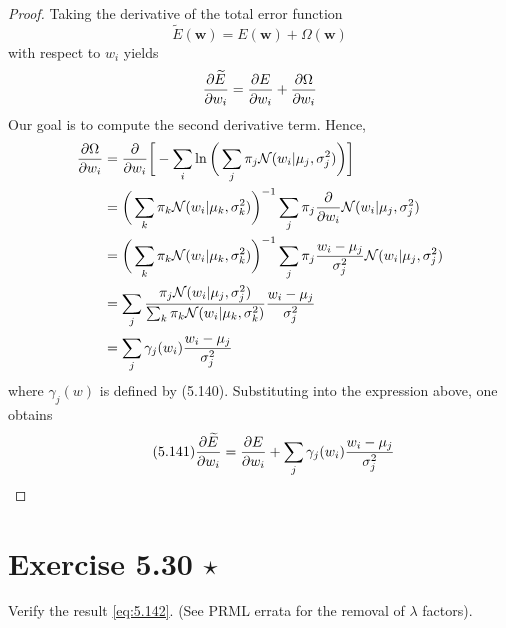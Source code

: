 \begin{proof}

    Taking the derivative of the total error function 
    \begin{equation}\label{eq:5.139}\tag{5.139}
        \widetilde{E}(\mathbf{w}) = E(\mathbf{w}) + \Omega(\mathbf{w})
    \end{equation}
    with respect to $w_i$ yields
    \begin{align*}
        \pdv{\widetilde{E}}{w_i} = \pdv{E}{w_i} + \pdv{\Omega}{w_i}
    \end{align*}
    Our goal is to compute the second derivative term. Hence,
    \begin{align*}
        \pdv{\Omega}{w_i} 
        &= \pdv{w_i} \bigg[-\sum_{i}^{} \ln\bigg(\sum_{j}^{} \pi_j \mathcal{N}(w_i | \mu_j, \sigma_j^2)\bigg)\bigg] \\
        &= \bigg(\sum_{k}^{} \pi_k \mathcal{N}(w_i | \mu_k, \sigma_k^2)\bigg)^{-1}
            \sum_{j}^{} \pi_j \pdv{w_i} \mathcal{N}(w_i | \mu_j, \sigma_j^2) \\
        &= \bigg(\sum_{k}^{} \pi_k \mathcal{N}(w_i | \mu_k, \sigma_k^2)\bigg)^{-1}
            \sum_{j}^{} \pi_j \frac{w_i - \mu_j}{\sigma_j^2} \mathcal{N}(w_i | \mu_j, \sigma_j^2) \\
        &= \sum_{j}^{} \frac{\pi_j \mathcal{N}(w_i | \mu_j, \sigma_j^2)} 
            {\sum_{k}^{} \pi_k \mathcal{N}(w_i | \mu_k, \sigma_k^2)} \frac{w_i - \mu_j}{\sigma_j^2} \\
        &= \sum_{j}^{} \gamma_j(w_i) \frac{w_i - \mu_j}{\sigma_j^2}
    \end{align*}
    where $\gamma_j(w)$ is defined by (5.140). 
    Substituting into the expression above, one obtains
    \begin{equation}\label{eq:5.141}\tag{5.141}
        \pdv{\widetilde{E}}{w_i} = \pdv{E}{w_i} + \sum_{j}^{} \gamma_j(w_i) \frac{w_i - \mu_j}{\sigma_j^2}
    \end{equation}
\end{proof}

\section*{Exercise 5.30 $\star$}
Verify the result \eqref{eq:5.142}. (See PRML errata for the removal of $\lambda$ factors).

\vspace{1em}

